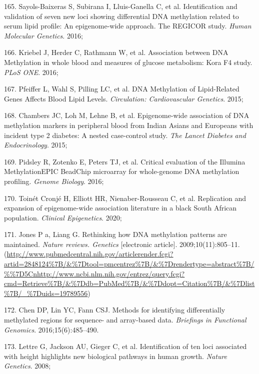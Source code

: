 \documentclass[11pt,oneside]{bristolthesis}
\newenvironment{cslreferences}%
  {}%
  {\par}
\begin{document}
\begin{cslreferences}
\leavevmode\hypertarget{ref-Sayols-Baixeras2016}{}%
165. Sayols-Baixeras S, Subirana I, Lluis-Ganella C, et al. Identification and validation of seven new loci showing differential DNA methylation related to serum lipid profile: An epigenome-wide approach. The REGICOR study. \emph{Human Molecular Genetics}. 2016;

\leavevmode\hypertarget{ref-Kriebel2016}{}%
166. Kriebel J, Herder C, Rathmann W, et al. Association between DNA Methylation in whole blood and measures of glucose metabolism: Kora F4 study. \emph{PLoS ONE}. 2016;

\leavevmode\hypertarget{ref-Pfeiffer2015}{}%
167. Pfeiffer L, Wahl S, Pilling LC, et al. DNA Methylation of Lipid-Related Genes Affects Blood Lipid Levels. \emph{Circulation: Cardiovascular Genetics}. 2015;

\leavevmode\hypertarget{ref-Chambers2015}{}%
168. Chambers JC, Loh M, Lehne B, et al. Epigenome-wide association of DNA methylation markers in peripheral blood from Indian Asians and Europeans with incident type 2 diabetes: A nested case-control study. \emph{The Lancet Diabetes and Endocrinology}. 2015;

\leavevmode\hypertarget{ref-Pidsley2016}{}%
169. Pidsley R, Zotenko E, Peters TJ, et al. Critical evaluation of the Illumina MethylationEPIC BeadChip microarray for whole-genome DNA methylation profiling. \emph{Genome Biology}. 2016;

\leavevmode\hypertarget{ref-ToinetCronje2020}{}%
170. Toinét Cronjé H, Elliott HR, Nienaber-Rousseau C, et al. Replication and expansion of epigenome-wide association literature in a black South African population. \emph{Clinical Epigenetics}. 2020;

\leavevmode\hypertarget{ref-Jones2009}{}%
171. Jones P a, Liang G. Rethinking how DNA methylation patterns are maintained. \emph{Nature reviews. Genetics} {[}electronic article{]}. 2009;10(11):805--11. (\url{http://www.pubmedcentral.nih.gov/articlerender.fcgi?artid=2848124\%7B/\&\%7Dtool=pmcentrez\%7B/\&\%7Drendertype=abstract\%7B/\%\%7D5Cnhttp://www.ncbi.nlm.nih.gov/entrez/query.fcgi?cmd=Retrieve\%7B/\&\%7Ddb=PubMed\%7B/\&\%7Ddopt=Citation\%7B/\&\%7Dlist\%7B/_\%7Duids=19789556})

\leavevmode\hypertarget{ref-Chen2016}{}%
172. Chen DP, Lin YC, Fann CSJ. Methods for identifying differentially methylated regions for sequence- and array-based data. \emph{Briefings in Functional Genomics}. 2016;15(6):485--490.

\leavevmode\hypertarget{ref-Lettre2008}{}%
173. Lettre G, Jackson AU, Gieger C, et al. Identification of ten loci associated with height highlights new biological pathways in human growth. \emph{Nature Genetics}. 2008;


\end{cslreferences}
\end{document}
